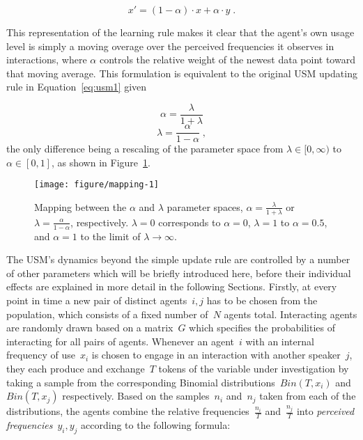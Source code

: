 \begin{equation}
x' = (1-\alpha)\cdot x + \alpha\cdot y\;.
\end{equation}

This representation of the learning rule makes it clear that the agent's own usage level is simply a moving overage over the perceived frequencies it observes in interactions, where $\alpha$ controls the relative weight of the newest data point toward that moving average.
This formulation is equivalent to the original USM updating rule in Equation~\ref{eq:usm1} given

\begin{equation}
\alpha = \frac{\lambda}{1+\lambda}
\end{equation}
\begin{equation}
\lambda = \frac{\alpha}{1-\alpha}\;,
\end{equation}
the only difference being a rescaling of the parameter space from $\lambda\in[0,\infty)$ to $\alpha\in[0,1]$, as shown in Figure~\ref{fig:mapping}.



\begin{figure}[htbp]

{\centering \texttt{[image: figure/mapping-1]} 

}

\caption[Mapping between the two USM learning rate parameter spaces]{Mapping between the $\alpha$ and $\lambda$ parameter spaces, $\alpha = \frac{\lambda}{1+\lambda}$ or $\lambda = \frac{\alpha}{1-\alpha}$, respectively. $\lambda = 0$ corresponds to $\alpha = 0$, $\lambda = 1$ to $\alpha = 0.5$, and $\alpha = 1$ to the limit of $\lambda\rightarrow\infty$.}\label{fig:mapping}
\end{figure}



The USM's dynamics beyond the simple update rule are controlled by a number of other parameters which will be briefly introduced here, before their individual effects are explained in more detail in the following Sections.
Firstly, at every point in time a new pair of distinct agents~$i, j$ has to be chosen from the population, which consists of a fixed number of~$N$ agents total. Interacting agents are randomly drawn based on a matrix~$G$ which specifies the probabilities of interacting for all pairs of agents. 
Whenever an agent~$i$ with an internal frequency of use~$x_i$ is chosen to engage in an interaction with another speaker~$j$, they each produce and exchange~$T$ tokens of the variable under investigation by taking a sample from the corresponding Binomial distributions~$Bin(T, x_i)$ and~$Bin(T, x_j)$ respectively. Based on the samples~$n_i$ and~$n_j$ taken from each of the distributions, the agents combine the relative frequencies~$\frac{n_i}{T}$ and~$\frac{n_j}{T}$ into \emph{perceived frequencies}~$y_i, y_j$ according to the following formula:

